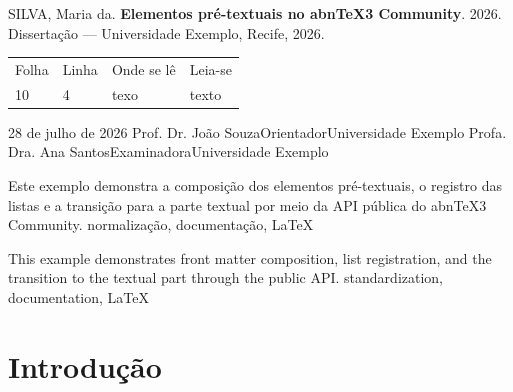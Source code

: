 \documentclass[12pt]{article}
\begin{document}
\ABNTEXcapa
{}

\ABNTEXpretextualpages
\ABNTEXfolhaderosto


\ABNTEXerrata
  {SILVA, Maria da. \textbf{Elementos pré-textuais no abnTeX3 Community}.
   2026. Dissertação — Universidade Exemplo, Recife, 2026.}
  {\begin{center}
     \begin{tabular}{llll}
       Folha & Linha & Onde se lê & Leia-se\\
       10 & 4 & texo & texto
     \end{tabular}
   \end{center}}

\ABNTEXfolhadeaprovacao
  {28 de julho de 2026}
  {%
    \ABNTEXmembrobanca
      {Prof. Dr. João Souza}{Orientador}{Universidade Exemplo}
    \ABNTEXmembrobanca
      {Profa. Dra. Ana Santos}{Examinadora}{Universidade Exemplo}
  }




\ABNTEXresumo
  {Este exemplo demonstra a composição dos elementos pré-textuais, o
   registro das listas e a transição para a parte textual por meio da API
   pública do abnTeX3 Community.}
  {normalização, documentação, LaTeX}

\ABNTEXresumoemlinguaestrangeira
  {This example demonstrates front matter composition, list registration,
   and the transition to the textual part through the public API.}
  {standardization, documentation, LaTeX}

\ABNTEXlistadeilustracoes
\ABNTEXlistadetabelas
\ABNTEXlistadeabreviaturas
\ABNTEXlistadesiglas
\ABNTEXlistadesimbolos
\ABNTEXsumario

\ABNTEXtextualpages

\section{Introdução}
\end{document}
